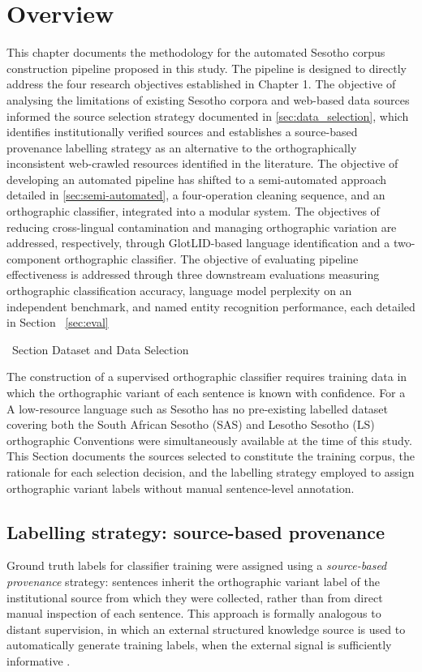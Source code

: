 \documentclass[12pt]{ThesisRU}
\begin{document}
\section{Overview}
This chapter documents the methodology for the automated Sesotho corpus construction pipeline proposed in this study. The pipeline is designed to directly address the four research objectives established in Chapter 1. The objective of analysing the limitations of existing Sesotho corpora and web-based data sources informed the source selection strategy documented in \ref{sec:data_selection}, which identifies institutionally verified sources and establishes a source-based provenance labelling strategy as an alternative to the orthographically inconsistent web-crawled resources identified in the literature. The objective of developing an automated pipeline has shifted to a semi-automated approach detailed in \ref{sec:semi-automated}, a four-operation cleaning sequence, and an orthographic classifier, integrated into a modular system. The objectives of reducing cross-lingual contamination and managing orthographic variation are addressed, respectively, through GlotLID-based language identification and a two-component orthographic classifier. The objective of evaluating pipeline effectiveness is addressed through three downstream evaluations measuring orthographic classification accuracy, language model perplexity on an independent benchmark, and named entity recognition performance, each detailed in Section ~\ref{sec:eval}

\ Section {Dataset and Data Selection}
\label{sec:data_selection}

The construction of a supervised orthographic classifier requires training data in
which the orthographic variant of each sentence is known with confidence. For a
A low-resource language such as Sesotho has no pre-existing labelled dataset covering
both the South African Sesotho (SAS) and Lesotho Sesotho (LS) orthographic
Conventions were simultaneously available at the time of this study. This Section
documents the sources selected to constitute the training corpus, the rationale
for each selection decision, and the labelling strategy employed to assign
orthographic variant labels without manual sentence-level annotation.

\subsection{Labelling strategy: source-based provenance}

Ground truth labels for classifier training were assigned using a
\textit{source-based provenance} strategy: sentences inherit the orthographic
variant label of the institutional source from which they were collected, rather
than from direct manual inspection of each sentence. This approach is formally analogous to distant supervision, in which an external structured knowledge source is used to automatically generate training labels, when the external signal is sufficiently informative \citep{quirk-poon-2017-distant}.
\end{document}
